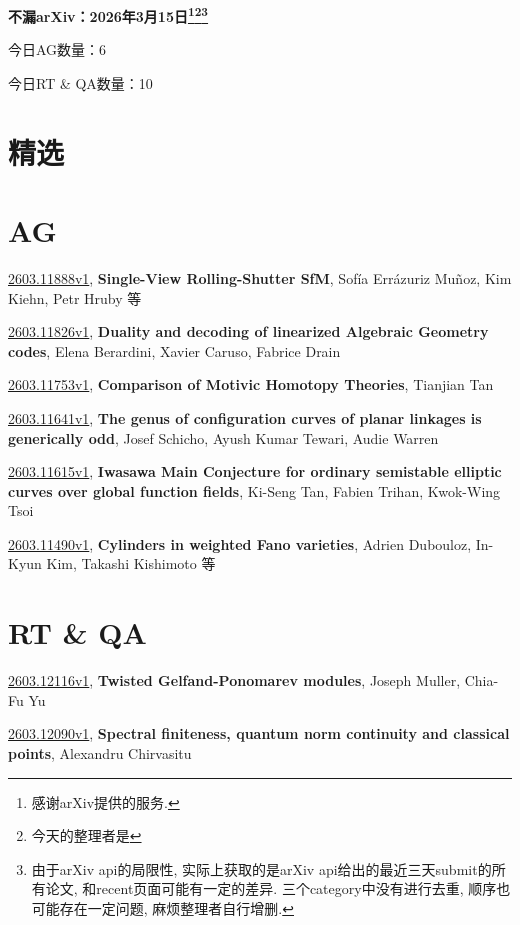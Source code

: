 \documentclass[9pt, a4paper]{article}
\theoremstyle{plain}
\theoremstyle{definition}
\theoremstyle{remark}
\newcommand{\arxiv}[3]{\href{https://arxiv.org/abs/#1}{#1}, \textbf{\textcolor{arxivblue}{#2}}, #3}
\newcommand{\AGnumber}{6}
\newcommand{\RTQAnumber}{10}
\newcommand{\NewestDate}{2026年3月15日}
\newcommand{\todayarXiver}{} %
\begin{document}
\begin{center}
    \Huge\textbf{不漏arXiv：\NewestDate\footnote{感谢arXiv提供的服务.}\footnote{今天的整理者是\todayarXiver}\footnote{由于arXiv api的局限性, 实际上获取的是arXiv api给出的最近三天submit的所有论文, 和recent页面可能有一定的差异. 三个category中没有进行去重, 顺序也可能存在一定问题, 麻烦整理者自行增删.}} \\
\end{center}

\setcounter{section}{-1}

\begin{center}
    今日AG数量：\AGnumber
    
    今日RT \& QA数量：\RTQAnumber
    
\end{center}


\section{精选}


\section{AG}
\arxiv{2603.11888v1}{Single-View Rolling-Shutter SfM}{Sofía Errázuriz Muñoz, Kim Kiehn, Petr Hruby 等}

\arxiv{2603.11826v1}{Duality and decoding of linearized Algebraic Geometry codes}{Elena Berardini, Xavier Caruso, Fabrice Drain}

\arxiv{2603.11753v1}{Comparison of Motivic Homotopy Theories}{Tianjian Tan}

\arxiv{2603.11641v1}{The genus of configuration curves of planar linkages is generically odd}{Josef Schicho, Ayush Kumar Tewari, Audie Warren}

\arxiv{2603.11615v1}{Iwasawa Main Conjecture for ordinary semistable elliptic curves over global function fields}{Ki-Seng Tan, Fabien Trihan, Kwok-Wing Tsoi}

\arxiv{2603.11490v1}{Cylinders in weighted Fano varieties}{Adrien Dubouloz, In-Kyun Kim, Takashi Kishimoto 等}


\section{RT \& QA}
\arxiv{2603.12116v1}{Twisted Gelfand-Ponomarev modules}{Joseph Muller, Chia-Fu Yu}

\arxiv{2603.12090v1}{Spectral finiteness, quantum norm continuity and classical points}{Alexandru Chirvasitu}
\end{document}
